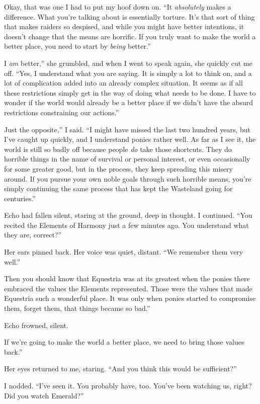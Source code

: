Okay, that was one I had to put my hoof down on. “It \textit{absolutely} makes a difference. What you’re talking about is essentially torture. It’s that sort of thing that makes raiders so despised, and while you might have better intentions, it doesn’t change that the means are horrific. If you truly want to make the world a better place, you need to start by \textit{being} better.”

\leavevmode{}I \textit{am} better,” she grumbled, and when I went to speak again, she quickly cut me off. “Yes, I understand what you are saying. It is simply a lot to think on, and a lot of complication added into an already complex situation. It seems as if all these restrictions simply get in the way of doing what needs to be done. I have to wonder if the world would already be a better place if we didn’t have the absurd restrictions constraining our actions.”

\leavevmode{}Just the opposite,” I said. “I might have missed the last two hundred years, but I’ve caught up quickly, and I understand ponies rather well. As far as I see it, the world is still so badly off because people \textit{do} take those shortcuts. They do horrible things in the name of survival or personal interest, or even occasionally for some greater good, but in the process, they keep spreading this misery around. If you pursue your own noble goals through such horrible means, you’re simply continuing the same process that has kept the Wasteland going for centuries.”

Echo had fallen silent, staring at the ground, deep in thought. I continued. “You recited the Elements of Harmony just a few minutes ago. You understand what they are, correct?”

Her ears pinned back. Her voice was quiet, distant. “We remember them very well.”

\leavevmode{}Then you should know that Equestria was at its greatest when the ponies there embraced the values the Elements represented. Those were the values that made Equestria such a wonderful place. It was only when ponies started to compromise them, forget them, that things became so bad.”

Echo frowned, silent.

\leavevmode{}If we’re going to make the world a better place, we need to bring those values back.”

Her eyes returned to me, staring. “And you think this would be sufficient?”

I nodded. “I’ve seen it. You probably have, too. You’ve been watching us, right? Did you watch Emerald?”

